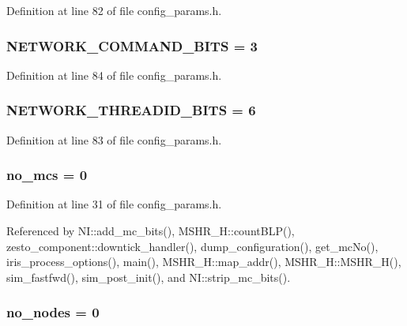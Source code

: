Definition at line 82 of file config\_\-params.h.
\subsubsection[{NETWORK\_\-COMMAND\_\-BITS}]{ {\bf NETWORK\_\-COMMAND\_\-BITS} = 3}\label{config__params_8h_dc7fe0dd54cfc2c2acf6e737e18116a1}




Definition at line 84 of file config\_\-params.h.
\subsubsection[{NETWORK\_\-THREADID\_\-BITS}]{ {\bf NETWORK\_\-THREADID\_\-BITS} = 6}\label{config__params_8h_582a80c814dfe22c0a7ad5dda77d2033}




Definition at line 83 of file config\_\-params.h.
\subsubsection[{no\_\-mcs}]{ {\bf no\_\-mcs} = 0}\label{config__params_8h_56d27d790e05179f3787fce80d802d04}




Definition at line 31 of file config\_\-params.h.

Referenced by NI::add\_\-mc\_\-bits(), MSHR\_\-H::countBLP(), zesto\_\-component::downtick\_\-handler(), dump\_\-configuration(), get\_\-mcNo(), iris\_\-process\_\-options(), main(), MSHR\_\-H::map\_\-addr(), MSHR\_\-H::MSHR\_\-H(), sim\_\-fastfwd(), sim\_\-post\_\-init(), and NI::strip\_\-mc\_\-bits().
\subsubsection[{no\_\-nodes}]{ {\bf no\_\-nodes} = 0}\label{config__params_8h_b78c10782810279fb9680eafef33b77d}





